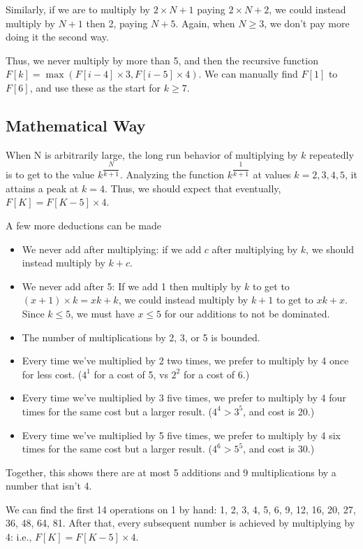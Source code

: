 Similarly, if we are to multiply by $2\times N+1$ paying $2\times N+2$, we could instead multiply by $N+1$ then 2, paying $N+5$. Again, when $N \geq 3$, we don't pay more doing it the second way.

Thus, we never multiply by more than 5, and then the recursive function $F[k] = \max(F[i-4]\times 3, F[i-5]\times 4)$. We can manually find $F[1]$ to $F[6]$, and use these as the start for $k\geq 7$.

\subsection{Mathematical Way}

When N is arbitrarily large, the long run behavior of multiplying by $k$ repeatedly is to get to the value
$k^{\dfrac{N}{k+1}}$​. Analyzing the function $k^{\dfrac{1}{k+1}}$ at values $k=2,3,4,5$, it attains a peak at $k=4$. Thus, we should expect that eventually, $F[K] = F[K-5] \times 4$.

A few more deductions can be made

\begin{itemize}
\item We never add after multiplying: if we add $c$ after multiplying by $k$, we should instead multiply by $k+c$.

\item We never add after 5: If we add 1 then multiply by $k$ to get to $(x+1) \times k = xk + k$, we could instead multiply by $k+1$ to get to $xk + x$. Since $k \leq 5$, we must have $x \leq 5$ for our additions to not be dominated.

\item The number of multiplications by 2, 3, or 5 is bounded.

\item Every time we've multiplied by 2 two times, we prefer to multiply by 4 once for less cost. ($4^1$ for a cost of 5, vs $2^2$ for a cost of 6.)
\item Every time we've multiplied by 3 five times, we prefer to multiply by 4 four times for the same cost but a larger result. ($4^4 > 3^5$, and cost is 20.)

\item Every time we've multiplied by 5 five times, we prefer to multiply by 4 six times for the same cost but a larger result. ($4^6 > 5^5$, and cost is 30.)
\end{itemize}

Together, this shows there are at most 5 additions and 9 multiplications by a number that isn't 4.

We can find the first 14 operations on 1 by hand: 1, 2, 3, 4, 5, 6, 9, 12, 16, 20, 27, 36, 48, 64, 81. After that, every subsequent number is achieved by multiplying by 4: i.e., $F[K] = F[K-5] \times 4$.
